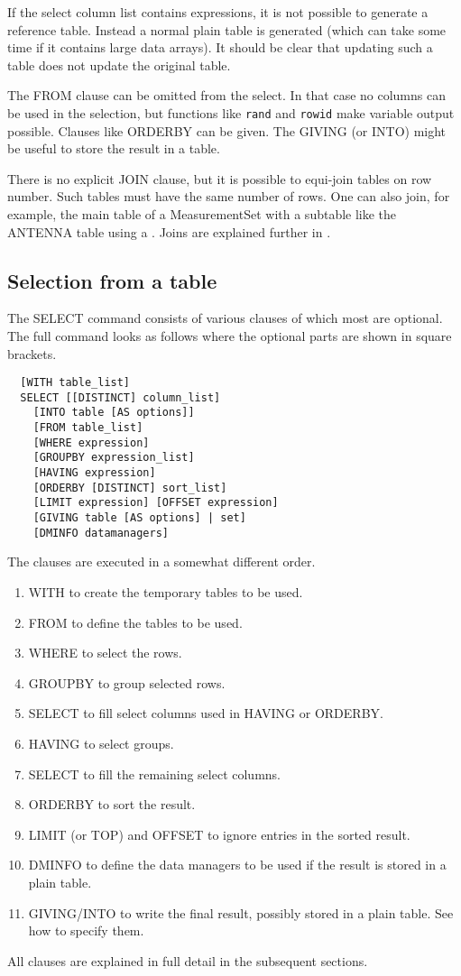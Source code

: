 If the select column list contains expressions, it is not possible to
generate a reference table. Instead a normal plain table is generated
(which can take some time if it contains large data arrays).
It should be clear that updating such a table does not update the
original table.

The FROM clause can be omitted from the select. In that case
no columns can be used in the selection, but functions like {\tt rand}
and {\tt rowid} make variable output possible. Clauses
like ORDERBY can be given. The GIVING (or
INTO) might be useful to store the result in a table.

There is no explicit JOIN clause, but it is possible to
equi-join tables on row number.
Such tables must have the same number of rows.
One can also join, for example, the main table of a
MeasurementSet with a subtable like the ANTENNA table using a
.
Joins are explained further in
.

\subsection{\label{TAQL:SELECT}Selection from a table}
The SELECT command consists of various clauses of which most are
optional. The full command looks as follows where the optional
parts are shown in square brackets.
\begin{verbatim}
  [WITH table_list]
  SELECT [[DISTINCT] column_list]
    [INTO table [AS options]]
    [FROM table_list]
    [WHERE expression]
    [GROUPBY expression_list]
    [HAVING expression]
    [ORDERBY [DISTINCT] sort_list]
    [LIMIT expression] [OFFSET expression]
    [GIVING table [AS options] | set]
    [DMINFO datamanagers]
\end{verbatim}
The clauses are executed in a somewhat different order.
\begin{enumerate}
\item WITH to create the temporary tables to be used.
\item FROM to define the tables to be used.
\item WHERE to select the rows.
\item GROUPBY to group selected rows.
\item SELECT to fill select columns used in HAVING or ORDERBY.
\item HAVING to select groups.
\item SELECT to fill the remaining select columns.
\item ORDERBY to sort the result.
\item LIMIT (or TOP) and OFFSET to ignore entries in the sorted result.
\item DMINFO to define the data managers to be used if the result is
  stored in a plain table.
\item GIVING/INTO to write the final result,
  possibly stored in a plain table. See
  how to specify them.
\end{enumerate}
All clauses are explained in full detail in the subsequent sections.

